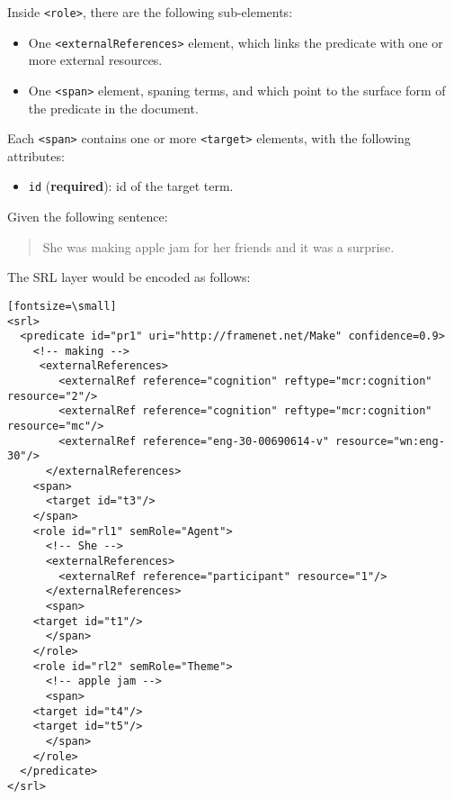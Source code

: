 Inside \texttt{<role>}, there are the following sub-elements:
\begin{itemize}
\item One \texttt{<externalReferences>} element, which links the predicate
  with one or more external resources.
\item One \texttt{<span>} element, spaning terms, and which point to the
  surface form of the predicate in the document.
\end{itemize}

Each \texttt{<span>} contains one or more \texttt{<target>}
elements, with the following attributes:

\begin{itemize}
\item \texttt{id} (\textbf{required}): id of the target term.
\end{itemize}

Given the following sentence:

\begin{quote}
  She was making apple jam for her friends and it was a surprise.
\end{quote}

The SRL layer would be encoded as follows:

\begin{verbatim}[fontsize=\small]
<srl>
  <predicate id="pr1" uri="http://framenet.net/Make" confidence=0.9>
    <!-- making -->
     <externalReferences>
        <externalRef reference="cognition" reftype="mcr:cognition" resource="2"/>
        <externalRef reference="cognition" reftype="mcr:cognition" resource="mc"/>
        <externalRef reference="eng-30-00690614-v" resource="wn:eng-30"/>
      </externalReferences>
    <span>
      <target id="t3"/>
    </span>
    <role id="rl1" semRole="Agent">
      <!-- She -->
      <externalReferences>
        <externalRef reference="participant" resource="1"/>
      </externalReferences>
      <span>
	<target id="t1"/>
      </span>
    </role>
    <role id="rl2" semRole="Theme">
      <!-- apple jam -->
      <span>
	<target id="t4"/>
	<target id="t5"/>
      </span>
    </role>
  </predicate>
</srl>
\end{verbatim}


